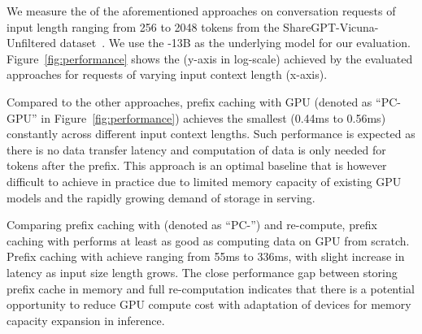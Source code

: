 We measure the \ttft of the aforementioned approaches on conversation requests of input length ranging from 256 to 2048 tokens from the ShareGPT-Vicuna-Unfiltered dataset~\cite{dataset}.
We use the -13B as the underlying model for our evaluation.
Figure~\ref{fig:performance} shows the \ttft (y-axis in log-scale) achieved by the evaluated approaches for requests of varying input context length (x-axis). 

Compared to the other approaches, prefix caching with GPU (denoted as ``PC-GPU'' in Figure~\ref{fig:performance}) achieves the smallest \ttft (0.44ms to 0.56ms) constantly across different input context lengths. Such performance is expected as there is no data transfer latency and computation of \kv data is only needed for tokens after the prefix. 
This approach is an optimal baseline that is however difficult to achieve in practice due to limited memory capacity of existing GPU models and the rapidly growing demand of \kvcache storage in \llm serving.

Comparing prefix caching with \cxl (denoted as ``PC-\cxl'') and \kv re-compute, prefix caching with \cxl performs at least as good as computing \kv data on GPU from scratch. Prefix caching with \cxl achieve \ttft ranging from 55ms to 336ms, with slight increase in latency as input size length grows. The close performance gap between storing prefix \kv cache in \cxl memory and full \kv re-computation indicates that there is a potential opportunity to reduce GPU compute cost with adaptation of \cxl devices for memory capacity expansion in \llm inference.

